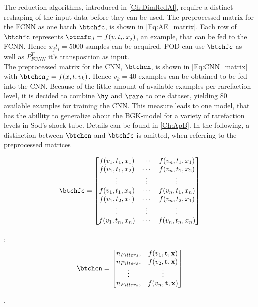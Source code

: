 The reduction algorithms, introduced in \cref{Ch:DimRedAl}, require a distinct reshaping of the input data before they can be used. The preprocessed matrix for the FCNN as one batch  \(\btchfc\), is shown in \cref{Eq:AE_matrix}. Each row of \(\btchfc\) represents \(\btchfc_{,l}=f(v,t_i,x_j)\), an example, that can be fed to the FCNN. Hence \(x_jt_i=5000\) samples can be acquired. POD can use \(\btchfc\) as well as \(P^T_{FCNN}\) it's transposition as input.\\
The preprocessed matrix for the CNN, \(\btchcn\), is shown in \cref{Eq:CNN_matrix} with \(\btchcn_{,l} = f(x,t,v_k)\). Hence \(v_k=40\) examples can be obtained to be fed into the CNN. Because of the little amount of available examples per rarefaction level, it is decided to combine \(\hy\) and \(\rare\) to one dataset, yielding 80 available examples for training the CNN. This measure leads to one model, that has the abillity to generalize about the BGK-model for a variety of rarefaction levels in Sod's shock tube. Details can be found in \cref{Ch:ApB}. In the following, a distinction between \(\btchcn\) and \(\btchfc\) is omitted, when referring to the preprocessed matrices\\
\begin{minipage}{.45\linewidth}
	\begin{gather}
	\btchfc = \begin{bmatrix}
	f(v_1,t_1,x_1)&\cdots &f(v_n,t_1,x_1) \\
	f(v_1,t_1,x_2)&\cdots &f(v_n,t_1,x_2) \\
	\vdots& \vdots & \vdots\\
	f(v_1,t_1,x_n)&\cdots &f(v_n,t_1,x_n)\\
	f(v_1,t_2,x_1)&\cdots &f(v_n,t_2,x_1)\\
	\vdots & \vdots & \vdots\\
	f(v_1,t_n,x_n)&\cdots &f(v_n,t_n,x_n)
	\end{bmatrix}
	\label{Eq:AE_matrix}
	\end{gather}
\end{minipage},\qquad%
\begin{minipage}{.35\linewidth}
	\begin{gather}
	\btchcn= \begin{bmatrix}
	n_{Filters},&f(v_1,\textbf{t},\textbf{x})\\
	n_{Filters},&f(v_2,\textbf{t},\textbf{x})\\
	\vdots&\vdots\\
	n_{Filters},&f(v_n,\textbf{t},\textbf{x})
	\end{bmatrix}
	\label{Eq:CNN_matrix}
	\end{gather}
\end{minipage}\textrm{.}\\\\

